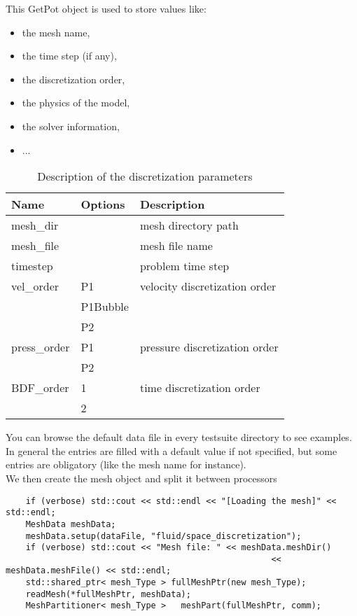 \noindent This GetPot object is used to store values like:
\begin{itemize}
\item the mesh name,
\item the time step (if any),
\item the discretization order,
\item the physics of the model,
\item the solver information,
\item ...
\end{itemize}

\begin{table}
\begin{center}
\begin{tabular}{|l|l|l|}
\hline
Name & Options & Description \\
\hline \hline
mesh\_dir & & mesh directory path \\ \hline
mesh\_file & & mesh file name \\ \hline
timestep & & problem time step \\ \hline
vel\_order & P1 & velocity discretization order \\ \
& P1Bubble & \\
& P2 & \\ \hline
press\_order & P1 & pressure discretization order \\
& P2 & \\ \hline
BDF\_order & 1 & time discretization order \\
& 2 & \\ \hline
\end{tabular}
\end{center}
\caption{Description of the discretization parameters
}
\label{table-bcparams}
\end{table}

You can browse the default data file in every testsuite directory to see examples.
In general the entries
are filled with a default value if not specified,
but some entries are obligatory (like the mesh name for instance). \\
 We then create the mesh object and split it between processors

\begin{verbatim}
    if (verbose) std::cout << std::endl << "[Loading the mesh]" << std::endl;
    MeshData meshData;
    meshData.setup(dataFile, "fluid/space_discretization");
    if (verbose) std::cout << "Mesh file: " << meshData.meshDir() 
    					                             << meshData.meshFile() << std::endl;
    std::shared_ptr< mesh_Type > fullMeshPtr(new mesh_Type);
    readMesh(*fullMeshPtr, meshData);
    MeshPartitioner< mesh_Type >   meshPart(fullMeshPtr, comm);
\end{verbatim}


